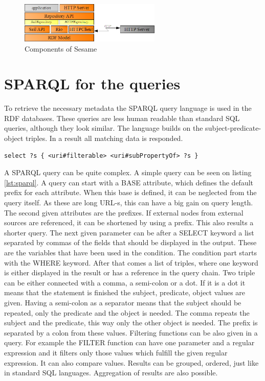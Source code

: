 \begin{figure}[h]
\centering
\includegraphics[width=0.6\textwidth]{figures/sesame-components.png}
\caption{Components of Sesame\label{fig:sesame}}
\end{figure}

\section{SPARQL for the queries}

To retrieve the necessary metadata the SPARQL query language is used in the RDF databases. These queries are less human readable than standard SQL queries, although they look similar. The language builds on the subject-predicate-object triples. In a result all matching data is responded. 

\begin{lstlisting}[caption={Sample SPARQL that queries all filterable objects\label{lst:sparql}}]
select ?s { <uri#filterable> <uri#subPropertyOf> ?s }
\end{lstlisting}

A SPARQL query can be quite complex. A simple query can be seen on listing \ref{lst:sparql}. A query can start with a BASE attribute, which defines the default prefix for each attribute. When this base is defined, it can be neglected from the query itself. As these are long URL-s, this can have a big gain on query length. The second given attributes are the prefixes. If external nodes from external sources are referenced, it can be shortened by using a prefix. This also results a shorter query. The next given parameter can be after a SELECT keyword a list separated by commas of the fields that should be displayed in the output. These are the variables that have been used in the condition. 
The condition part starts with the WHERE keyword. After that comes a list of triples, where one keyword is either displayed in the result or has a reference in the query chain. Two triple can be either connected with a comma, a semi-colon or a dot. If it is a dot it means that the statement is finished the subject, predicate, object values are given. Having a semi-colon as a separator means that the subject should be repeated, only the predicate and the object is needed. The comma repeats the subject and the predicate, this way only the other object is needed. The prefix is separated by a colon from these values. Filtering functions can be also given in a query. For example the FILTER function can have one parameter and a regular expression and it filters only those values which fulfill the given regular expression. It can also compare values. Results can be grouped, ordered, just like in standard SQL languages. Aggregation of results are also possible. 

